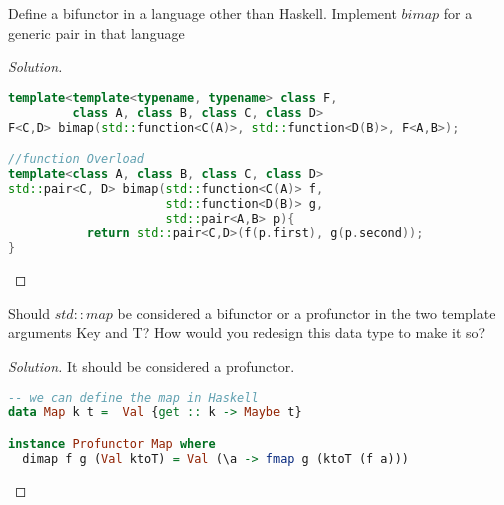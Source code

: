 \documentclass[7x10,thmnumcontwithchapter,WebLink,AddlevelTwoTOC,NumRef,BookEndNote,printer]{pupbook}
\begin{document}
\begin{exercise}
Define a bifunctor in a language other than Haskell. Implement $bimap$ for a generic pair in that language
\end{exercise}

\begin{proof}[Solution]
~\\

\begin{lstlisting}[language=C++]
template<template<typename, typename> class F, 
         class A, class B, class C, class D>
F<C,D> bimap(std::function<C(A)>, std::function<D(B)>, F<A,B>);

//function Overload
template<class A, class B, class C, class D>
std::pair<C, D> bimap(std::function<C(A)> f, 
                      std::function<D(B)> g, 
                      std::pair<A,B> p){
           return std::pair<C,D>(f(p.first), g(p.second));
}
\end{lstlisting}
\end{proof}

\begin{exercise}
Should $std::map$ be considered a bifunctor or a profunctor in the two template arguments Key and T? How would you redesign this data type to make it so?
\end{exercise}

\begin{proof}[Solution]
It should be considered  a profunctor.
\begin{lstlisting}[language=Haskell]
-- we can define the map in Haskell
data Map k t =  Val {get :: k -> Maybe t} 

instance Profunctor Map where
  dimap f g (Val ktoT) = Val (\a -> fmap g (ktoT (f a)))   

\end{lstlisting}	
\end{proof}
\end{document}
